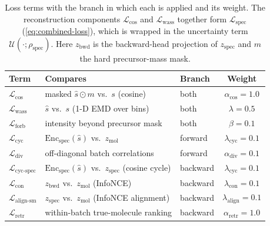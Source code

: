 \begin{table}[H]
    \centering
    \small
    \caption[Loss Terms]{Loss terms with the branch in which each is applied and its weight. 
    The reconstruction components $\mathcal{L}_{\cos}$ and $\mathcal{L}_{\mathrm{wass}}$ together form $\mathcal{L}_{\mathrm{spec}}$ (\cref{eq:combined-loss}), which is wrapped in the uncertainty term $\mathcal{U}(\cdot;\rho_{\mathrm{spec}})$.
    Here $z_{\mathrm{bwd}}$ is the backward-head projection of $z_{\mathrm{spec}}$ and $m$ the hard precursor-mass mask.}
    \label{tab:loss-terms}
    \begin{tabular}{lllc}
        \hline
        Term & Compares & Branch & Weight \\
        \hline
        $\mathcal{L}_{\cos}$            & masked $\hat{s}\odot m$ vs.\ $s$ (cosine)                       & both     & $\alpha_{\cos}=1.0$ \\
        $\mathcal{L}_{\mathrm{wass}}$   & $\hat{s}$ vs.\ $s$ (1-D EMD over bins)                          & both     & $\lambda=0.5$ \\
        $\mathcal{L}_{\mathrm{forb}}$   & intensity beyond precursor mask                                 & both     & $\beta=0.1$ \\
        $\mathcal{L}_{\mathrm{cyc}}$    & $\mathrm{Enc}_{\mathrm{spec}}(\hat{s})$ vs.\ $z_{\mathrm{mol}}$  & forward  & $\lambda_{\mathrm{cyc}}=0.1$ \\
        $\mathcal{L}_{\mathrm{div}}$    & off-diagonal batch correlations                                 & forward  & $\alpha_{\mathrm{div}}=0.1$ \\
        $\mathcal{L}_{\text{cyc-spec}}$ & $\mathrm{Enc}_{\mathrm{spec}}(\hat{s})$ vs.\ $z_{\mathrm{spec}}$ (cosine cycle) & backward & $\lambda_{\mathrm{cyc}}=0.1$ \\
        $\mathcal{L}_{\mathrm{con}}$    & $z_{\mathrm{bwd}}$ vs.\ $z_{\mathrm{mol}}$ (InfoNCE)            & backward & $\lambda_{\mathrm{con}}=0.1$ \\
        $\mathcal{L}_{\text{align-sm}}$ & $z_{\mathrm{spec}}$ vs.\ $z_{\mathrm{mol}}$ (InfoNCE alignment)  & backward & $\lambda_{\text{align}}=0.1$ \\
        $\mathcal{L}_{\mathrm{retr}}$   & within-batch true-molecule ranking                              & backward & $\alpha_{\mathrm{retr}}=1.0$ \\
        \hline
    \end{tabular}
\end{table}

